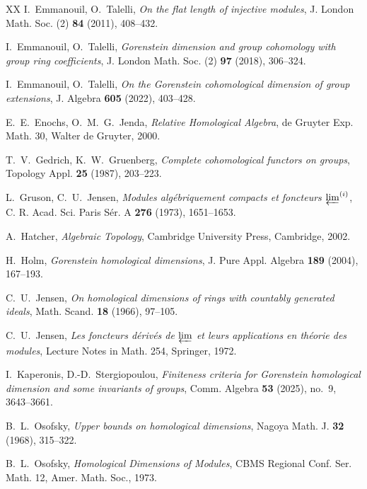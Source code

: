 \documentclass[12pt]{amsart}
\theoremstyle{remark}
\theoremstyle{definition}
\theoremstyle{plain}
\begin{document}
\begin{thebibliography}{XX}
 I.~Emmanouil, O.~Talelli, \emph{On the flat length of injective modules}, J. London Math. Soc. (2) \textbf{84} (2011), 408--432.

 I.~Emmanouil, O.~Talelli, \emph{Gorenstein dimension and group cohomology with group ring coefficients}, J. London Math. Soc. (2) \textbf{97} (2018), 306--324.

 I.~Emmanouil, O.~Talelli, \emph{On the Gorenstein cohomological dimension of group extensions}, J. Algebra \textbf{605} (2022), 403--428.

 E.~E.~Enochs, O.~M.~G.~Jenda, \emph{Relative Homological Algebra}, de Gruyter Exp. Math. 30, Walter de Gruyter, 2000.

 T.~V.~Gedrich, K.~W.~Gruenberg, \emph{Complete cohomological functors on groups}, Topology Appl. \textbf{25} (1987), 203--223.

 L.~Gruson, C.~U.~Jensen, \emph{Modules alg\'ebriquement compacts et foncteurs $\varprojlim^{(i)}$}, C. R. Acad. Sci. Paris S\'er. A \textbf{276} (1973), 1651--1653.

 A.~Hatcher, \emph{Algebraic Topology}, Cambridge University Press, Cambridge, 2002.

 H.~Holm, \emph{Gorenstein homological dimensions}, J. Pure Appl. Algebra \textbf{189} (2004), 167--193.

 C.~U.~Jensen, \emph{On homological dimensions of rings with countably generated ideals}, Math. Scand. \textbf{18} (1966), 97--105.

 C.~U.~Jensen, \emph{Les foncteurs d\'eriv\'es de $\varprojlim$ et leurs applications en th\'eorie des modules}, Lecture Notes in Math. 254, Springer, 1972.

 I.~Kaperonis, D.-D.~Stergiopoulou, \emph{Finiteness criteria for Gorenstein homological dimension and some invariants of groups}, Comm. Algebra \textbf{53} (2025), no.~9, 3643--3661.

 B.~L.~Osofsky, \emph{Upper bounds on homological dimensions}, Nagoya Math. J. \textbf{32} (1968), 315--322.

 B.~L.~Osofsky, \emph{Homological Dimensions of Modules}, CBMS Regional Conf. Ser. Math. 12, Amer. Math. Soc., 1973.



\end{thebibliography}
\end{document}
